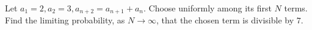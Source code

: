 Let $ a_1=2,a_2=3,a_{n+2}=a_{n+1}+a_n $. Choose uniformly among its first $ N $ terms. Find the limiting probability, as $ N\to\infty $, that the chosen term is divisible by $ 7 $.
